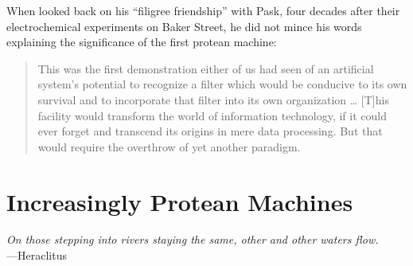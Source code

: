When \citet{beer2001filigree} looked back on his ``filigree friendship'' with Pask, four decades after their electrochemical experiments on Baker Street,
he did not mince his words explaining the significance of the 
first protean machine:
\begin{quote}
\small
This was the first demonstration either of us had seen of an artificial system's potential to recognize a filter which would be conducive to its own survival and to incorporate that filter into its own organization%
\dots
[T]his
facility would transform the world of information
technology, if it could ever forget and transcend its origins in mere data
processing. But that would require the overthrow of yet another paradigm.
\end{quote}





\section{Increasingly Protean Machines}



\begin{changemargin}{4em}{4em} 

\vspace{1em}

\textit{On those stepping into rivers staying the same, other and other waters flow.} \\[4pt]
\hspace*{16.5em} ---Heraclitus

\vspace{1em}

\end{changemargin}


